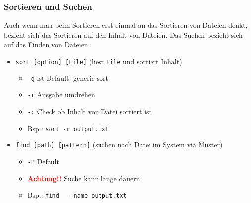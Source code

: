 \documentclass[12pt,utf8, handout]{beamer}
\begin{document}
\begin{frame}
\frametitle{Sortieren und Suchen}
Auch wenn man beim Sortieren erst einmal an das Sortieren von Dateien denkt,
bezieht sich das Sortieren auf den Inhalt von Dateien.
Das Suchen bezieht sich auf das Finden von Dateien.
\begin{itemize}[<+->]
	\item \texttt{sort [option] [File]} (liest \texttt{File} und sortiert Inhalt)
	\begin{itemize}[<+->]
		\item \texttt{-g} ist Default. generic sort
		\item \texttt{-r} Ausgabe umdrehen
		\item \texttt{-c} Check ob Inhalt von Datei sortiert ist
		\item Bsp.: \texttt{sort -r output.txt}
	\end{itemize}
	\item \texttt{find [path] [pattern]} (suchen nach Datei im System via Muster)
	\begin{itemize}[<+->]
		\item \texttt{-P} Default
		\item \textbf{\textcolor{red}{Achtung!!}} Suche kann lange dauern
		\item Bsp.: \texttt{find ~ -name output.txt}
	\end{itemize}
\end{itemize}
\end{frame}
\end{document}
